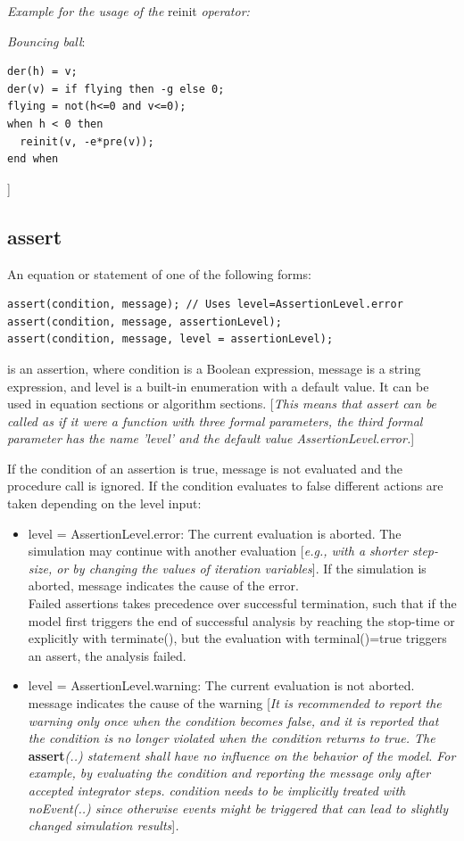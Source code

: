 \documentclass[10pt,a4paper]{report}
\def\doublelabel#1{\label{#1}}
\begin{document}
\emph{Example for the usage of the} reinit \emph{operator:}

\emph{Bouncing ball}:
\begin{lstlisting}[language=modelica]
der(h) = v;  
der(v) = if flying then -g else 0; 
flying = not(h<=0 and v<=0); 
when h < 0 then
  reinit(v, -e*pre(v)); 
end when
\end{lstlisting}

{]}

\subsection{assert}\doublelabel{assert}

An equation or statement of one of the following forms:

\begin{lstlisting}[language=modelica]
assert(condition, message); // Uses level=AssertionLevel.error
assert(condition, message, assertionLevel);
assert(condition, message, level = assertionLevel);
\end{lstlisting}

is an assertion, where condition is a Boolean expression, message is a
string expression, and level is a built-in enumeration with a default
value. It can be used in equation sections or algorithm sections.
{[}\emph{This means that assert can be called as if it were a function
with three formal parameters, the third formal parameter has the name
'level' and the default value AssertionLevel.error.}{]}

If the condition of an assertion is true, message is not evaluated and
the procedure call is ignored. If the condition evaluates to false
different actions are taken depending on the level input:

\begin{itemize}
\item
  level = AssertionLevel.error: The current evaluation is aborted. The
  simulation may continue with another evaluation {[}\emph{e.g., with a
  shorter step-size, or by changing the values of iteration
  variables}{]}. If the simulation is aborted, message indicates the
  cause of the error.\\
  Failed assertions takes precedence over successful termination, such
  that if the model first triggers the end of successful analysis by
  reaching the stop-time or explicitly with terminate(), but the
  evaluation with terminal()=true triggers an assert, the analysis
  failed.
\item
  level = AssertionLevel.warning: The current evaluation is not aborted.
  message indicates the cause of the warning {[}\emph{It is recommended
  to report the warning only once when the condition becomes false, and
  it is reported that the condition is no longer violated when the
  condition returns to true. The} \textbf{assert}\emph{(..) statement
  shall have no influence on the behavior of the model. For example, by
  evaluating the condition and reporting the message only after accepted
  integrator steps. condition needs to be implicitly treated with
  noEvent(..) since otherwise events might be triggered that can lead to
  slightly changed simulation results}{]}\emph{.}
\end{itemize}
\end{document}
